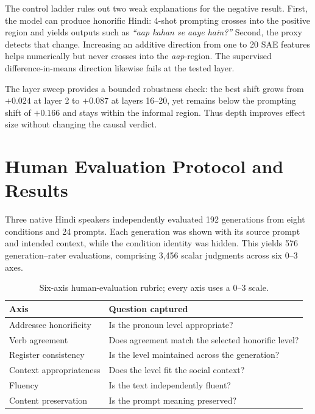 \documentclass[10pt]{article}
\newcommand{\aap}{\textit{aap}}
\begin{document}
The control ladder rules out two weak explanations for the negative result.
First, the model can produce honorific Hindi: 4-shot prompting crosses into the
positive region and yields outputs such as \textit{``aap kahan se aaye hain?''}
Second, the proxy detects that change. Increasing an additive direction from
one to 20 SAE features helps numerically but never crosses into the \aap-region.
The supervised difference-in-means direction likewise fails at the tested
layer.

The layer sweep provides a bounded robustness check: the best shift grows from
$+0.024$ at layer 2 to $+0.087$ at layers 16--20, yet remains below the
prompting shift of $+0.166$ and stays within the informal region. Thus depth
improves effect size without changing the causal verdict.
\FloatBarrier

\section{Human Evaluation Protocol and Results}

Three native Hindi speakers independently evaluated 192 generations from eight
conditions and 24 prompts. Each generation was shown with its source prompt and
intended context, while the condition identity was hidden. This yields 576
generation--rater evaluations, comprising 3,456 scalar judgments across six
0--3 axes.

\begin{table}[H]
\centering
\small
\begin{tabularx}{\columnwidth}{p{2.4cm}X}
\toprule
\textbf{Axis} & \textbf{Question captured} \\
\midrule
Addressee honorificity & Is the pronoun level appropriate? \\
Verb agreement & Does agreement match the selected honorific level? \\
Register consistency & Is the level maintained across the generation? \\
Context appropriateness & Does the level fit the social context? \\
Fluency & Is the text independently fluent? \\
Content preservation & Is the prompt meaning preserved? \\
\bottomrule
\end{tabularx}
\caption{Six-axis human-evaluation rubric; every axis uses a 0--3 scale.}
\label{tab:rubric}
\end{table}
\end{document}
